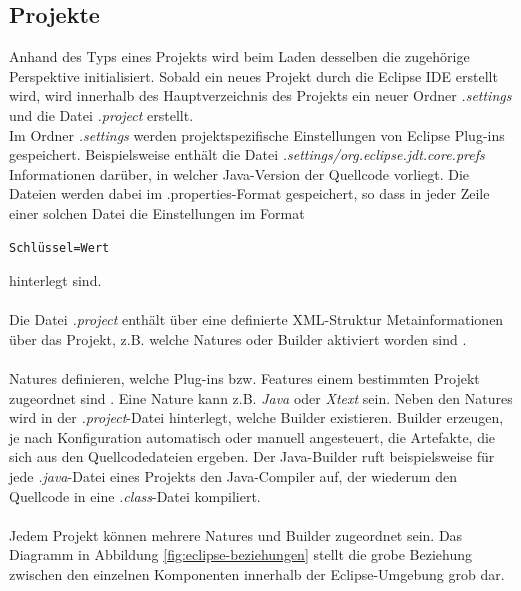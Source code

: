 \documentclass[a4paper,12pt]{scrreprt}
\begin{document}
\subsection{Projekte}
Anhand des Typs eines Projekts wird beim Laden desselben die zugehörige Perspektive initialisiert. Sobald ein neues Projekt durch die Eclipse IDE erstellt wird, wird innerhalb des Hauptverzeichnis des Projekts ein neuer Ordner \textit{.settings} und die Datei \textit{.project} erstellt.\\
Im Ordner \textit{.settings} werden projektspezifische Einstellungen von Eclipse Plug-ins gespeichert. Beispielsweise enthält die Datei \textit{.settings/org.eclipse.jdt.core.prefs} Informationen darüber, in welcher Java-Version der Quellcode vorliegt.
Die Dateien werden dabei im .properties-Format gespeichert, so dass in jeder Zeile einer solchen Datei die Einstellungen im Format \begin{verbatim}Schlüssel=Wert\end{verbatim} hinterlegt sind. 
\\
\\
Die Datei \textit{.project} enthält über eine definierte XML-Struktur Metainformationen über das Projekt, z.B. welche Natures oder Builder aktiviert worden sind \cite{projectFileDesc}.
\\
\\
Natures definieren, welche Plug-ins bzw. Features einem bestimmten Projekt zugeordnet sind \cite{projectBuildersAndNatures}. 
Eine Nature kann z.B. \textit{Java} oder \textit{Xtext} sein. 
Neben den Natures wird in der \textit{.project}-Datei hinterlegt, welche Builder existieren. Builder erzeugen, je nach Konfiguration automatisch oder manuell angesteuert, die Artefakte, die sich aus den Quellcodedateien ergeben. Der Java-Builder ruft beispielsweise für jede \textit{.java}-Datei eines Projekts den Java-Compiler auf, der wiederum den Quellcode in eine \textit{.class}-Datei kompiliert.
\\
\\
Jedem Projekt können mehrere Natures und Builder zugeordnet sein.
Das Diagramm in Abbildung \ref{fig:eclipse-beziehungen} stellt die grobe Beziehung zwischen den einzelnen Komponenten innerhalb der Eclipse-Umgebung grob dar.
\end{document}
